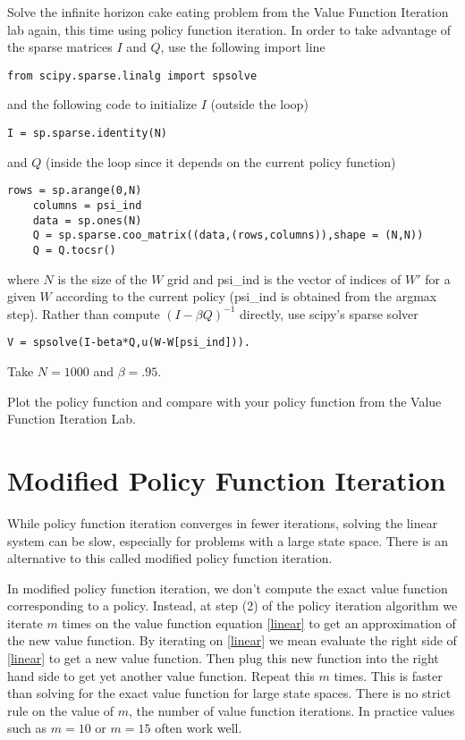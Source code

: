 \begin{problem}
Solve the infinite horizon cake eating problem from the Value Function Iteration lab again, this time using policy function iteration.  In order to take advantage of the sparse matrices $I$ and $Q$, use the following import line

\begin{lstlisting}[style=python]
  from scipy.sparse.linalg import spsolve
\end{lstlisting}

and the following code to initialize $I$ (outside the loop)
\begin{lstlisting}[style=python]
I = sp.sparse.identity(N)
\end{lstlisting}
and $Q$ (inside the loop since it depends on the current policy function)
\begin{lstlisting}[style=python]
    rows = sp.arange(0,N)
    columns = psi_ind
    data = sp.ones(N)
    Q = sp.sparse.coo_matrix((data,(rows,columns)),shape = (N,N))
    Q = Q.tocsr()
\end{lstlisting}
where $N$ is the size of the $W$ grid and psi\_ind is the vector of indices of $W'$ for a given $W$ according to the current policy (psi\_ind is obtained from the argmax step).  Rather than compute $(I-\beta Q)^{-1}$ directly, use scipy's sparse solver

\begin{lstlisting}[style=python]
V = spsolve(I-beta*Q,u(W-W[psi_ind])).
\end{lstlisting}



Take $N = 1000$ and $\beta = .95$.

Plot the policy function and compare with your policy function from the Value Function Iteration Lab.
\end{problem}

\section*{Modified Policy Function Iteration}

While policy function iteration converges in fewer iterations, solving the linear system can be slow, especially for problems with a large state space.  There is an alternative to this called modified policy function iteration.

In modified policy function iteration, we don't compute the exact value function corresponding to a policy.  Instead, at step (2) of the policy iteration algorithm we iterate $m$ times on the value function equation \eqref{linear} to get an approximation of the new value function.  By iterating on \eqref{linear} we mean evaluate the right side of \eqref{linear} to get a new value function.  Then plug this new function into the right hand side to get yet another value function.  Repeat this $m$ times.  This is faster than solving for the exact value function for large state spaces.  There is no strict rule on the value of $m$, the number of value function iterations.  In practice values such as $m=10$ or $m=15$ often work well.

